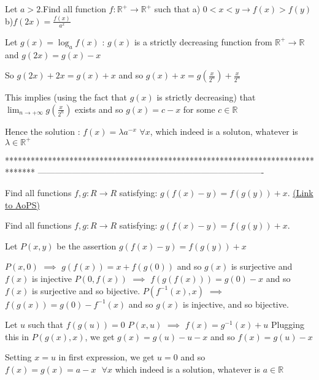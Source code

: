 \begin{solution}
	\begin{tcolorbox}Let $a >2$.Find all function $ f:\mathbb{R}^+\to\mathbb{R}^+ $ such that
a) $0<x<y \rightarrow  f(x) > f(y)$
b)$f(2x)=\frac{f(x)}{a^{x}}$\end{tcolorbox}
Let $g(x)=\log_a f(x)$ : $g(x)$ is a strictly decreasing function from $\mathbb R^+\to \mathbb R$ and $g(2x)=g(x)-x$

So $g(2x)+2x=g(x)+x$ and so $g(x)+x=g(\frac x{2^n})+\frac x{2^n}$

This implies (using the fact that $g(x)$ is strictly decreasing) that $\lim_{n\to+\infty}g(\frac x{2^n})$ exists and so $g(x)=c-x$ for some $c\in\mathbb R$

Hence the solution : $\boxed{f(x)=\lambda a^{-x}}$ $\forall x$, which indeed is a soluton, whatever is $\lambda\in\mathbb R^+$
\end{solution}
*******************************************************************************
-------------------------------------------------------------------------------

\begin{problem}
	Find all functions $ f,g: R \longrightarrow R$ satisfying:
$g(f(x)-y)=f(g(y))+x$.
	\flushright \href{https://artofproblemsolving.com/community/c6h586280}{(Link to AoPS)}
\end{problem}



\begin{solution}
	\begin{tcolorbox}Find all functions $ f,g: R \longrightarrow R$ satisfying:
$g(f(x)-y)=f(g(y))+x$.\end{tcolorbox}
Let $P(x,y)$ be the assertion $g(f(x)-y)=f(g(y))+x$

$P(x,0)$ $\implies$ $g(f(x))=x+f(g(0))$ and so $g(x)$ is surjective and $f(x)$ is injective
$P(0,f(x))$ $\implies$ $f(g(f(x)))=g(0)-x$ and so $f(x)$ is surjective and so bijective.
$P(f^{-1}(x),x)$ $\implies$ $f(g(x))=g(0)-f^{-1}(x)$ and so $g(x)$ is injective, and so bijective.

Let $u$ such that $f(g(u))=0$ 
$P(x,u)$ $\implies$ $f(x)=g^{-1}(x)+u$
Plugging this in $P(g(x),x)$, we get $g(x)=g(u)-u-x$ and so $f(x)=g(u)-x$

Setting $x=u$ in first expression, we get $u=0$ and so $\boxed{f(x)=g(x)=a-x\text{   }\forall x}$ which indeed is a solution, whatever is $a\in\mathbb R$
\end{solution}



